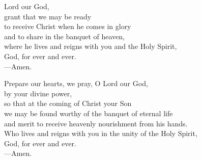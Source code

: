 \prayer


\begin{prayerverse}
Lord our God,\\
grant that we may be ready\\
to receive Christ when he comes in glory\\
and to share in the banquet of heaven,\\
where he lives and reigns with you and the Holy Spirit,\\
God, for ever and ever.\\
{\color{red}---\thinspace}Amen.
\end{prayerverse}


\begin{prayerverse}
Prepare our hearts, we pray, O Lord our God,\\
by your divine power,\\
so that at the coming of Christ your Son\\
we may be found worthy of the banquet of eternal life\\
and merit to receive heavenly nourishment from his hands.\\
Who lives and reigns with you in the unity of the Holy Spirit,\\
God, for ever and ever.\\
{\color{red}---\thinspace}Amen.
\end{prayerverse}

